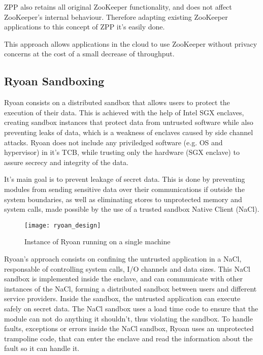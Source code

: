 ZPP also retains all original ZooKeeper functionality, and does not affect ZooKeeper's internal behaviour. Therefore adapting existing ZooKeeper applications to this concept of ZPP it's easily done.

This approach allows applications in the cloud to use ZooKeeper without privacy concerns at the cost of a small decrease of throughput.

\subsection{Ryoan Sandboxing}

Ryoan \cite{ryoanPaper} consists on a distributed sandbox that allows users to protect the execution of their data. This is achieved with the help of Intel SGX \cite{intelSGX} \cite{sgxPaper} enclaves, creating sandbox instances that protect data from untrusted software while also preventing leaks of data, which is a weakness of enclaves caused by side channel attacks.
Ryoan does not include any priviledged software (e.g. OS and hypervisor) in it's TCB, while trusting only the hardware (SGX enclave) to assure secrecy and integrity of the data.

It's main goal is to prevent leakage of secret data. This is done by preventing modules from sending sensitive data over their communications if outside the system boundaries, as well as eliminating stores to unprotected memory and system calls, made possible by the use of a trusted sandbox Native Client (NaCl). 

\begin{figure}[htbp]
	\centering
	{\texttt{[image: ryoan\_design]}}%
	\caption{Instance of Ryoan running on a single machine}
\end{figure}

Ryoan's approach consists on confining the untrusted application in a NaCl, responsable of controlling system calls, I/O channels and data sizes. This NaCl sandbox is implemented inside the enclave, and can communicate with other instances of the NaCl, forming a distributed sandbox between users and different service providers. Inside the sandbox, the untrusted application can execute safely on secret data. The NaCl sandbox uses a load time code to ensure that the module can not do anything it shouldn't, thus violating the sandbox. To handle faults, exceptions or errors inside the NaCl sandbox, Ryoan uses an unprotected trampoline code, that can enter the enclave and read the information about the fault so it can handle it.



